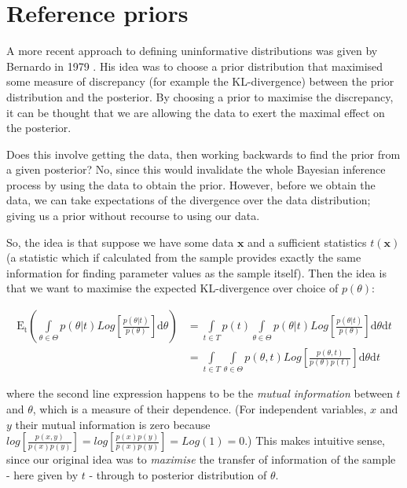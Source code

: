\documentclass[11pt,fullpage]{book}
\begin{document}
\section{Reference priors}
A more recent approach to defining uninformative distributions was given by Bernardo in 1979 \cite{bernardo1979reference}. His idea was to choose a prior distribution that maximised some measure of discrepancy (for example the KL-divergence) between the prior distribution and the posterior. By choosing a prior to maximise the discrepancy, it can be thought that we are allowing the data to exert the maximal effect on the posterior. 

Does this involve getting the data, then working backwards to find the prior from a given posterior? No, since this would invalidate the whole Bayesian inference process by using the data to obtain the prior. However, before we obtain the data, we can take expectations of the divergence over the data distribution; giving us a prior without recourse to using our data. 

So, the idea is that suppose we have some data $\boldsymbol{x}$ and a sufficient statistics $t(\boldsymbol{x})$ (a statistic which if calculated from the sample provides exactly the same information for finding parameter values as the sample itself). Then the idea is that we want to maximise the expected KL-divergence over choice of $p(\theta)$:

\begin{equation}
\begin{align}
\mathrm{E_t}\left(\int\limits_{\theta\in\Theta} p(\theta|t) Log\left[\frac{p(\theta|t)}{p(\theta)}\right]\mathrm{d}\theta\right) &= \int\limits_{t\in T} p(t) \int\limits_{\theta\in\Theta} p(\theta|t) Log\left[\frac{p(\theta|t)}{p(\theta)}\right]\mathrm{d}\theta\mathrm{d}t\\
&= \int\limits_{t\in T} \int\limits_{\theta\in\Theta} p(\theta,t) Log\left[\frac{p(\theta,t)}{p(\theta)p(t)}\right]\mathrm{d}\theta\mathrm{d}t
\end{align}
\end{equation}

where the second line expression happens to be the \textit{mutual information} between $t$ and $\theta$, which is a measure of their dependence. (For independent variables, $x$ and $y$ their mutual information is zero because $log\left[\frac{p(x,y)}{p(x)p(y)}\right] = log\left[\frac{p(x)p(y)}{p(x)p(y)}\right]=Log(1)=0$.) This makes intuitive sense, since our original idea was to \textit{maximise} the transfer of information of the sample - here given by $t$ - through to posterior distribution of $\theta$. 
\end{document}
